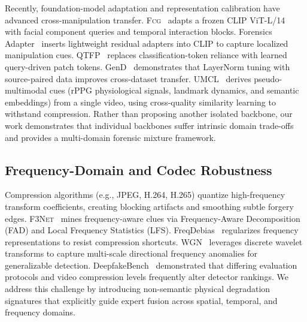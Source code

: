 \documentclass[conference]{IEEEtran}
\newcommand{\fcg}{\textsc{Fcg}}
\newcommand{\fthreenet}{\textsc{F3Net}}
\begin{document}
Recently, foundation-model adaptation and representation calibration have advanced cross-manipulation transfer. \fcg{}~\cite{han2025fcg} adapts a frozen CLIP ViT-L/14~\cite{radford2021clip} with facial component queries and temporal interaction blocks. Forensics Adapter~\cite{cui2025forensicsadapter} inserts lightweight residual adapters into CLIP to capture localized manipulation cues. QTFP~\cite{wang2026qtfp} replaces classification-token reliance with learned query-driven patch tokens. GenD~\cite{yermakov2026gend} demonstrates that LayerNorm tuning with source-paired data improves cross-dataset transfer. UMCL~\cite{umcl2026} derives pseudo-multimodal cues (rPPG physiological signals, landmark dynamics, and semantic embeddings) from a single video, using cross-quality similarity learning to withstand compression. Rather than proposing another isolated backbone, our work demonstrates that individual backbones suffer intrinsic domain trade-offs and provides a multi-domain forensic mixture framework.

\subsection{Frequency-Domain and Codec Robustness}
Compression algorithms (e.g., JPEG, H.264, H.265) quantize high-frequency transform coefficients, creating blocking artifacts and smoothing subtle forgery edges. \fthreenet{}~\cite{qian2020f3net} mines frequency-aware clues via Frequency-Aware Decomposition (FAD) and Local Frequency Statistics (LFS). FreqDebias~\cite{kashiani2025freqdebias} regularizes frequency representations to resist compression shortcuts. WGN~\cite{ghosh2026wgn} leverages discrete wavelet transforms to capture multi-scale directional frequency anomalies for generalizable detection. DeepfakeBench~\cite{yan2023deepfakebench} demonstrated that differing evaluation protocols and video compression levels frequently alter detector rankings. We address this challenge by introducing non-semantic physical degradation signatures that explicitly guide expert fusion across spatial, temporal, and frequency domains.
\end{document}
